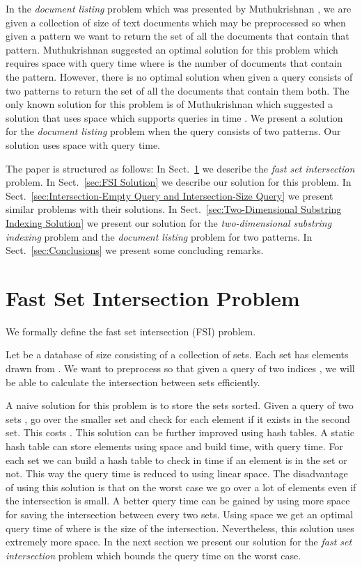 \documentclass[10pt]{llncs}
\begin{document}
In the \emph{document listing} problem which was presented by Muthukrishnan \cite{Muthu02},
we are given a collection of size  of text documents
which may be preprocessed
so when given a pattern  we want to return the set of all the documents that contain that pattern.
Muthukrishnan suggested an optimal solution for this problem
which requires  space with  query time
where  is the number of documents that contain the pattern.
However, there is no optimal solution
when given a query consists of two patterns  to return the set of all the documents that contain them both.
The only known solution for this problem is of Muthukrishnan \cite{Muthu02}
which suggested a solution that uses  space
which supports queries in time .
We present a solution for the \emph{document listing} problem when the query consists of two patterns.
Our solution uses  space
with  query time.

The paper is structured as follows:
In Sect.~\ref{sec:FSI Problem} we describe the \emph{fast set intersection} problem.
In Sect.~\ref{sec:FSI Solution} we describe our solution for this problem.
In Sect.~\ref{sec:Intersection-Empty Query and Intersection-Size Query}
we present similar problems with their solutions.
In Sect.~\ref{sec:Two-Dimensional Substring Indexing Solution}
we present our solution for the \emph{two-dimensional substring indexing} problem
and the \emph{document listing} problem for two patterns.
In Sect.~\ref{sec:Conclusions} we present some concluding remarks.


\section{Fast Set Intersection Problem}\label{sec:FSI Problem}
We formally define the fast set intersection (FSI) problem.

\begin{definition}
Let  be a database of size  consisting of a collection of  sets.
Each set has elements drawn from .
We want to preprocess  so that given a query of two indices ,
we will be able to calculate the intersection between sets  efficiently.
\end{definition}

A naive solution for this problem is to store the sets sorted.
Given a query of two sets , go over the smaller set and check for each element if it exists in the second set.
This costs .
This solution can be further improved using hash tables.
A static hash table \cite{Fredman84} can store  elements
using  space and build time, with  query time.
For each set we can build a hash table to check in  time if an element is in the set or not.
This way the query time is reduced to  using linear space.
The disadvantage of using this solution is that on the worst case
we go over a lot of elements even if the intersection is small.
A better query time can be gained by using more space
for saving the intersection between every two sets.
Using  space we get an optimal query time of 
where  is the size of the intersection.
Nevertheless, this solution uses extremely more space.
In the next section we present our solution for the \emph{fast set intersection} problem
which bounds the query time on the worst case.
\end{document}
